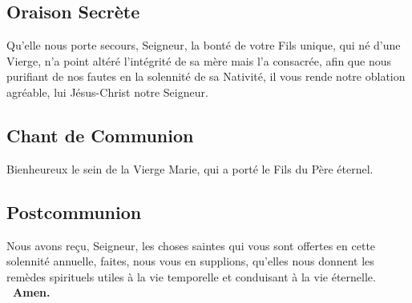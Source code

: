 \begin{multicols}{2}
\subsection*{Oraison Secrète}
Qu’elle nous porte secours, Seigneur, la bonté de votre Fils unique, qui né d’une Vierge, n’a point altéré l’intégrité de sa mère mais l’a consacrée, afin que nous purifiant de nos fautes en la solennité de sa Nativité, il vous rende notre oblation agréable, lui Jésus-Christ notre Seigneur.

\subsection*{Chant de Communion}
Bienheureux le sein de la Vierge Marie, qui a porté le Fils du Père éternel.

\subsection*{Postcommunion}
Nous avons reçu, Seigneur, les choses saintes qui vous sont offertes en cette solennité annuelle, faites, nous vous en supplions, qu’elles nous donnent les remèdes spirituels utiles à la vie temporelle et conduisant à la vie éternelle.
\textbf{ \rb\ Amen.}
\end{multicols}
